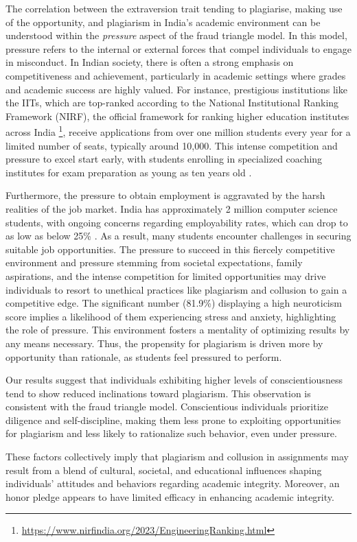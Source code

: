 The correlation between the extraversion trait tending to plagiarise, making use of the opportunity, and plagiarism in India's academic environment can be understood within the \textit{pressure} aspect of the fraud triangle model. In this model, pressure refers to the internal or external forces that compel individuals to engage in misconduct. In Indian society, there is often a strong emphasis on competitiveness and achievement, particularly in academic settings where grades and academic success are highly valued. For instance, prestigious institutions like the IITs, which are top-ranked according to the National Institutional Ranking Framework (NIRF), the official framework for ranking higher education institutes across India \footnote{\url{https://www.nirfindia.org/2023/EngineeringRanking.html}}, receive applications from over one million students every year for a limited number of seats, typically around 10,000. This intense competition and pressure to excel start early, with students enrolling in specialized coaching institutes for exam preparation as young as ten years old \cite{IITPrepMenace}. 

Furthermore, the pressure to obtain employment is aggravated by the harsh realities of the job market. India has approximately 2 million computer science students, with ongoing concerns regarding employability rates, which can drop to as low as below 25\% \cite{UnemploymentIndia, NAIR2020831}. As a result, many students encounter challenges in securing suitable job opportunities. The pressure to succeed in this fiercely competitive environment and pressure stemming from societal expectations, family aspirations, and the intense competition for limited opportunities may drive individuals to resort to unethical practices like plagiarism and collusion to gain a competitive edge. The significant number (81.9\%) displaying a high neuroticism score implies a likelihood of them experiencing stress and anxiety, highlighting the role of pressure. This environment fosters a mentality of optimizing results by any means necessary. Thus, the propensity for plagiarism is driven more by opportunity than rationale, as students feel pressured to perform. 

Our results suggest that individuals exhibiting higher levels of conscientiousness tend to show reduced inclinations toward plagiarism. This observation is consistent with the fraud triangle model. Conscientious individuals prioritize diligence and self-discipline, making them less prone to exploiting opportunities for plagiarism and less likely to rationalize such behavior, even under pressure.

These factors collectively imply that plagiarism and collusion in assignments may result from a blend of cultural, societal, and educational influences shaping individuals' attitudes and behaviors regarding academic integrity. Moreover, an honor pledge appears to have limited efficacy in enhancing academic integrity.
\vspace{-4pt}